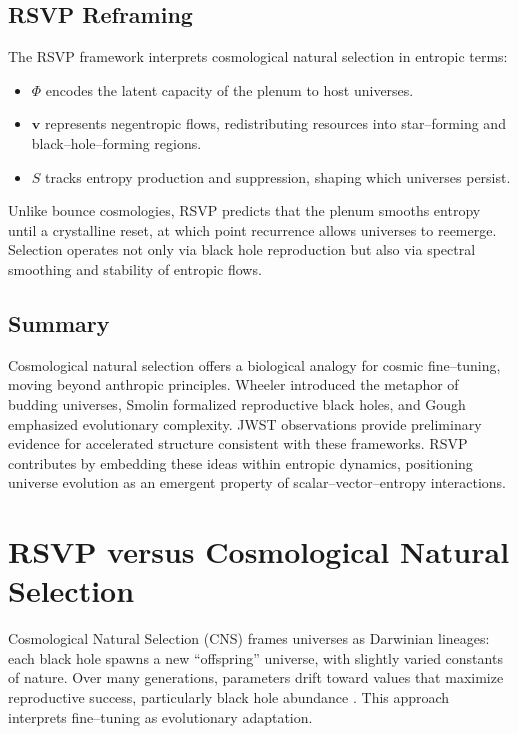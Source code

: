 \documentclass[a4paper,11pt,openany]{book}
\begin{document}
\section{RSVP Reframing}

The RSVP framework interprets cosmological natural selection in entropic terms:
\begin{itemize}
  \item $\Phi$ encodes the latent capacity of the plenum to host universes.
  \item $\mathbf{v}$ represents negentropic flows, redistributing resources into 
  star–forming and black–hole–forming regions.
  \item $S$ tracks entropy production and suppression, shaping which universes persist.
\end{itemize}
Unlike bounce cosmologies, RSVP predicts that the plenum smooths entropy until a crystalline 
reset, at which point recurrence allows universes to reemerge. Selection operates not only 
via black hole reproduction but also via spectral smoothing and stability of entropic flows.

\section{Summary}

Cosmological natural selection offers a biological analogy for cosmic fine–tuning, moving 
beyond anthropic principles. Wheeler introduced the metaphor of budding universes, Smolin 
formalized reproductive black holes, and Gough emphasized evolutionary complexity. JWST 
observations provide preliminary evidence for accelerated structure consistent with these 
frameworks. RSVP contributes by embedding these ideas within entropic dynamics, positioning 
universe evolution as an emergent property of scalar–vector–entropy interactions.

\chapter{RSVP versus Cosmological Natural Selection}

Cosmological Natural Selection (CNS) frames universes as Darwinian lineages: each black hole 
spawns a new “offspring” universe, with slightly varied constants of nature. Over many 
generations, parameters drift toward values that maximize reproductive success, particularly 
black hole abundance \citep{smolin1997cosmos}. This approach interprets fine–tuning as 
evolutionary adaptation.
\end{document}
